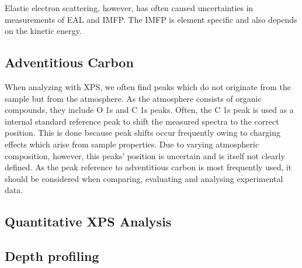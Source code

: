 Elastic electron scattering, however, has often caused uncertainties in measurements of EAL and IMFP. 
The IMFP is element specific and also depends on the kinetic energy. 


\subsection{Adventitious Carbon}

When analyzing with XPS, we often find peaks which do not originate from the sample but from the atmosphere. As the atmosphere consists of organic compounds, they include O 1s and C 1s peaks. Often, the C 1s peak is used as a internal standard reference peak to shift the measured spectra to the correct position. This is done because peak shifts occur frequently owing to charging effects which arise from sample properties. Due to varying atmospheric composition, however, this peaks' position is uncertain and is itself  not clearly defined. \cite{biesinger_accessing_2022} As the peak reference to adventitious carbon is most frequently used, it should be considered when comparing, evaluating and analysing experimental data.

\subsection{Quantitative XPS Analysis}

\subsection{Depth profiling}

